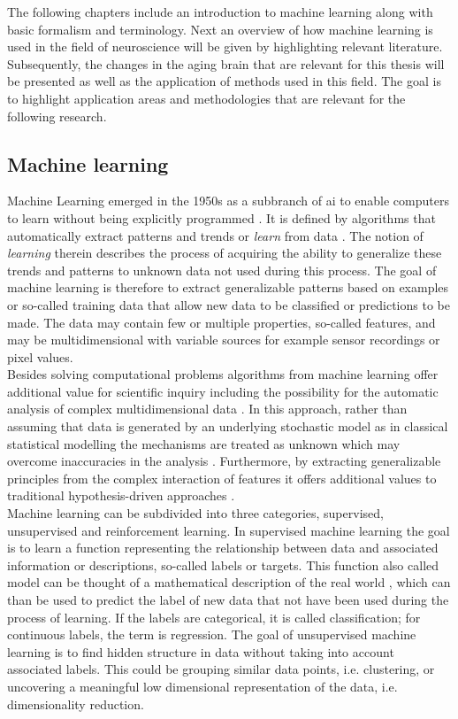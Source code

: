 The following chapters include an introduction to machine learning along with basic formalism and terminology. Next an overview of how machine learning is used in the field of neuroscience will be given by highlighting relevant literature. Subsequently, the changes in the aging brain that are relevant for this thesis will be presented as well as the application of methods used in this field. The goal is to highlight application areas and methodologies that are relevant for the following research.  

\subsection{Machine learning}
\label{subsec:ML}
Machine Learning emerged in the 1950s as a subbranch of \gls{ai} to enable computers to learn without being explicitly programmed \cite{Samual1959}. It is defined by algorithms that automatically extract patterns and trends or \textit{learn} from data \cite{Hastie2009}. The notion of \textit{learning} therein describes the process of acquiring the ability to generalize these trends and patterns to unknown data not used during this process. The goal of machine learning is therefore to extract generalizable patterns based on examples or so-called training data that allow new data to be classified or predictions to be made. The data may contain few or multiple properties, so-called features, and may be multidimensional with variable sources for example sensor recordings or pixel values.\\ 
Besides solving computational problems algorithms from machine learning offer additional value for scientific inquiry including the possibility for the automatic analysis of complex multidimensional data \cite{Brunton2019,Breiman2001}. In this approach, rather than assuming that data is generated by an underlying stochastic model as in classical statistical modelling the mechanisms are treated as unknown which may overcome inaccuracies in the analysis \cite{Breiman2001}. Furthermore, by extracting generalizable principles from the complex interaction of features it offers additional values to traditional hypothesis-driven approaches \cite{Vu1601,Bzdok2017}. \medskip\\
Machine learning can be subdivided into three categories, supervised, unsupervised and reinforcement learning. In supervised machine learning the goal is to learn a function representing the relationship between data and associated information or descriptions, so-called labels or targets.  This function also called model can be thought of a mathematical description of the real world \cite{Brunton2019}, which can than be used to predict the label of new data that not have been used during the process of learning. If the labels are categorical, it is called classification; for continuous labels, the term is regression. The goal of unsupervised machine learning is to find hidden structure in data without taking into account associated labels. This could be grouping similar data points, i.e. clustering, or uncovering a meaningful low dimensional representation of the data, i.e. dimensionality reduction. 
